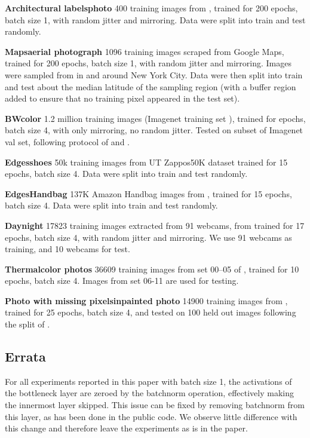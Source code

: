\documentclass[10pt,twocolumn,letterpaper]{article}
\begin{document}
{\bf Architectural labelsphoto} 400 training images from \cite{Tylecek13}, trained for 200 epochs, batch size 1, with random jitter and mirroring. Data were split into train and test randomly.

{\bf Mapsaerial photograph} 1096 training images scraped from Google Maps, trained for 200 epochs, batch size 1, with random jitter and mirroring. Images were sampled from in and around New York City. Data were then split into train and test about the median latitude of the sampling region (with a buffer region added to ensure that no training pixel appeared in the test set).

{\bf BWcolor} 1.2 million training images (Imagenet training set \cite{russakovsky2015imagenet}), trained for  epochs, batch size 4, with only mirroring, no random jitter. Tested on subset of Imagenet val set, following protocol of \cite{zhang2016colorful} and \cite{larsson2016learning}.

{\bf Edgesshoes} 50k training images from UT Zappos50K dataset \cite{yu2014fine} trained for 15 epochs, batch size 4.  Data were split into train and test randomly.

{\bf EdgesHandbag} 137K Amazon Handbag images from \cite{zhu2016generative}, trained for 15 epochs, batch size 4. Data were split into train and test randomly.

{\bf Daynight} 17823 training images extracted from 91 webcams, from \cite{laffont2014transient} trained for 17 epochs, batch size 4, with random jitter and mirroring. We use 91 webcams as training, and 10 webcams for test.

{\bf Thermalcolor photos} 36609 training images from set 00--05 of \cite{hwang2015multispectral}, trained for 10 epochs, batch size 4. Images from set 06-11 are used for testing.

{\bf Photo with missing pixelsinpainted photo} 14900 training images from \cite{doersch2012makes}, trained for 25 epochs, batch size 4, and tested on 100 held out images following the split of \cite{pathak2016context}.

\subsection{Errata}
For all experiments reported in this paper with batch size 1, the activations of the bottleneck layer are zeroed by the batchnorm operation, effectively making the innermost layer skipped. This issue can be fixed by removing batchnorm from this layer, as has been done in the public code. We observe little difference with this change and therefore leave the experiments as is in the paper.
\end{document}
